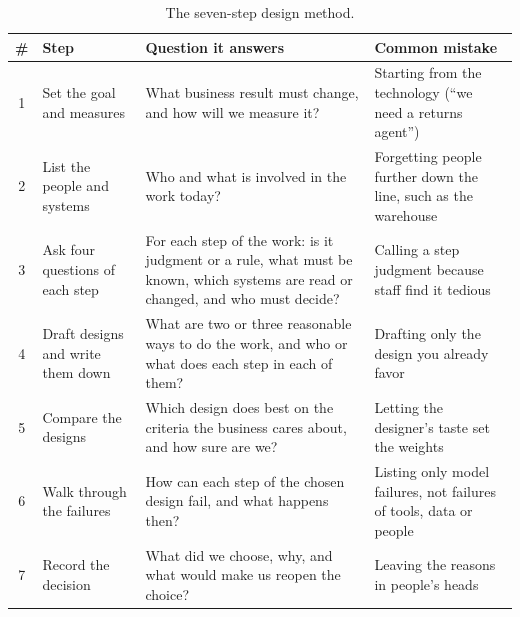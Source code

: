 \begin{table}[htbp]
\centering
\small
\caption{The seven-step design method.}
\label{tab:method}
\begin{tabularx}{\textwidth}{@{}c>{\raggedright\arraybackslash}p{2.6cm}>{\raggedright\arraybackslash}X>{\raggedright\arraybackslash}X@{}}
\toprule
\rowcolor{coHead} \# & Step & Question it answers & Common mistake \\
\midrule
1 & Set the goal and measures & What business result must change, and how will we measure it? & Starting from the technology (``we need a returns agent'') \\
2 & List the people and systems & Who and what is involved in the work today? & Forgetting people further down the line, such as the warehouse \\
3 & Ask four questions of each step & For each step of the work: is it judgment or a rule, what must be known, which systems are read or changed, and who must decide? & Calling a step judgment because staff find it tedious \\
4 & Draft designs and write them down & What are two or three reasonable ways to do the work, and who or what does each step in each of them? & Drafting only the design you already favor \\
5 & Compare the designs & Which design does best on the criteria the business cares about, and how sure are we? & Letting the designer's taste set the weights \\
6 & Walk through the failures & How can each step of the chosen design fail, and what happens then? & Listing only model failures, not failures of tools, data or people \\
7 & Record the decision & What did we choose, why, and what would make us reopen the choice? & Leaving the reasons in people's heads \\
\bottomrule
\end{tabularx}
\end{table}

